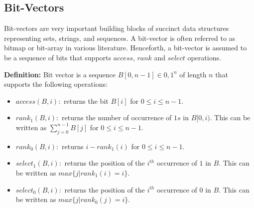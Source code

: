 \subsection{Bit-Vectors}
\label{bit-vectors}
Bit-vectors are very important building blocks of succinct data structures representing sets, strings, and sequences. A bit-vector is often referred to as bitmap or bit-array in various literature. Henceforth, a bit-vector is assumed to be a sequence of bits that supports $access$, $rank$ and $select$ operations. \par
\textbf{Definition:} Bit vector is a sequence  $B[0, n-1] \in {0,1}^n$ of length $n$ that supports the following operations:
\begin{itemize}
    \item $access(B, i):$ returns the bit $B[i]$ for $0 \leq i \leq n-1$.
    \item $rank_1(B, i):$ returns the number of occurrence of $1s$ in $B[0, i)$. This can be written as $\sum_{j=0}^{n-1} B[j]$  for $0 \leq i \leq n-1$.
    \item $rank_0(B, i):$ returns $i - rank_1(i)$  for $0 \leq i \leq n-1$.
    \item $select_1(B, i):$ returns the position of the $i^{th}$ occurrence of $1$ in $B$. This can be written as $max\{j | rank_1(i) = i\}$. 
    \item $select_0(B, i):$ returns the position of the $i^{th}$ occurrence of $0$ in $B$. This can be written as $max\{j | rank_0(j) = i\}$. 
\end{itemize}

